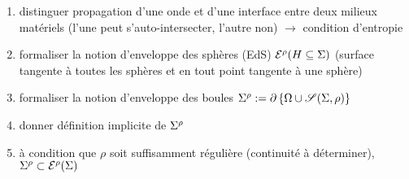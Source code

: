 \par\bigskip
\begin{enumerate}
	\item distinguer propagation d'une onde et d'une interface entre deux milieux matériels (l'une peut s'auto-intersecter, l'autre non) $\to$ condition d'entropie
	\item formaliser la notion d'enveloppe des sphères (EdS) ${\mathcal{E}}^{\rho}({H \subseteq \Sigma})$ (surface tangente à toutes les sphères et en tout point tangente à une sphère)
	\item formaliser la notion d'enveloppe des boules $\EdB{\Sigma}{\rho} := \boundary{\left\{\Omega \cup \sphere[\Sigma][\rho]\right\}}$
	\item donner définition implicite de ${\Sigma}^{\rho}$
	\item à condition que $\rho$ soit suffisamment régulière (continuité à déterminer), ${\Sigma}^{\rho} \subset {\mathcal{E}}^{\rho}({\Sigma})$
\end{enumerate}


